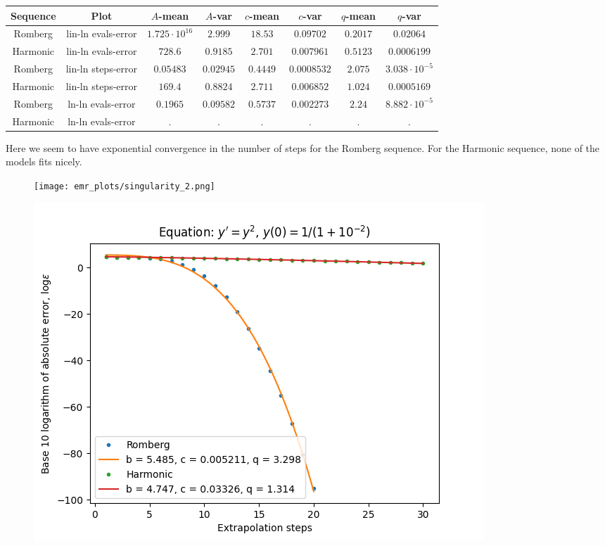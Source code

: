 \begin{table}[H]
    \centering
    \small
     \begin{tabular}{c|c||c|c|c|c|c|c}
Sequence & Plot & \(A\)-mean & \(A\)-var & \(c\)-mean & \(c\)-var & \(q\)-mean & \(q\)-var\\\hline
Romberg & lin-ln evals-error & \(1.725\cdot 10^{16}\) & \(2.999\) & \(18.53\) & \(0.09702\) & \(0.2017\) & \(0.02064\) \\
Harmonic & lin-ln evals-error & \(728.6\) & \(0.9185\) & \(2.701\) & \(0.007961\) & \(0.5123\) & \(0.0006199\) \\
Romberg & lin-ln steps-error & \(0.05483\) & \(0.02945\) & \(0.4449\) & \(0.0008532\) & \(2.075\) & \(3.038\cdot 10^{-5}\) \\
Harmonic & lin-ln steps-error & \(169.4\) & \(0.8824\) & \(2.711\) & \(0.006852\) & \(1.024\) & \(0.0005169\) \\
Romberg & ln-ln evals-error & \(0.1965\) & \(0.09582\) & \(0.5737\) & \(0.002273\) & \(2.24\) & \(8.882\cdot 10^{-5}\) \\
Harmonic & ln-ln evals-error & . & . & . & . & . & . \\
    \end{tabular}
    \label{tab:my_label}
\end{table}

Here we seem to have exponential convergence in the number of steps for the Romberg sequence. For the Harmonic sequence, none of the models fits nicely.

\begin{figure}[H]
\centering
\begin{minipage}{0.45\textwidth}
\centering
\texttt{[image: emr\_plots/singularity\_2.png]}
\end{minipage}
\begin{minipage}{0.45\textwidth}
\centering
\includegraphics[scale=0.45]{emr_plots/singularity_2_hp_steps.png}
\end{minipage}
\end{figure}

